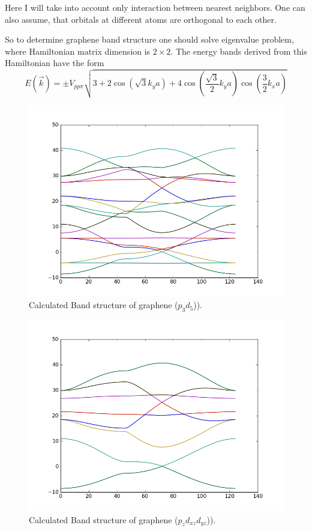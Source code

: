 Here I will take into account only interaction between nearest neighbors. One can also assume, that orbitals at different atoms are orthogonal to each other.

So to determine graphene band structure one should solve eigenvalue problem, where Hamiltonian matrix dimension is $2 \times 2$. The energy bands derived from this Hamiltonian have the form \cite{wallace}
\begin{equation}
	E(\vec{k}) = \pm V_{pp\pi}\sqrt{3 + 2 \cos\left(\sqrt{3} k_y a\right) + 4 \cos\left(\frac{\sqrt{3}}{2} k_y a\right) \cos\left(\frac{3}{2} k_x a\right)} 
\end{equation}

\begin{figure}[h] 
\begin{center}
  \includegraphics[width=0.55\linewidth]{img/graphene_pd_soc}
  \caption{Calculated Band structure of graphene ($p_3d_5$)).}
\end{center}
\end{figure}
\begin{figure}[h] 
\begin{center}
  \includegraphics[width=0.55\linewidth]{img/graphene_pd_soc3}
  \caption{Calculated Band structure of graphene ($p_zd_{xz}d_{yz}$)).}
\end{center}
\end{figure}
